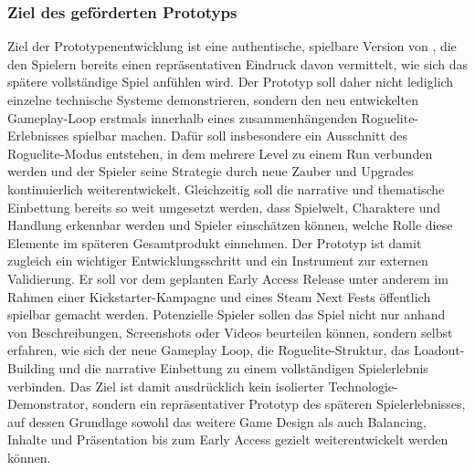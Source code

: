 \subsubsection{Ziel des geförderten Prototyps}
Ziel der Prototypenentwicklung ist eine authentische, spielbare Version von \coc, die den Spielern bereits einen repräsentativen Eindruck davon vermittelt, wie sich das spätere vollständige Spiel anfühlen wird.
Der Prototyp soll daher nicht lediglich einzelne technische Systeme demonstrieren, sondern den neu entwickelten Gameplay-Loop erstmals innerhalb eines zusammenhängenden Roguelite-Erlebnisses spielbar machen.
Dafür soll insbesondere ein Ausschnitt des Roguelite-Modus entstehen, in dem mehrere Level zu einem Run verbunden werden und der Spieler seine Strategie durch neue Zauber und Upgrades kontinuierlich weiterentwickelt.
Gleichzeitig soll die narrative und thematische Einbettung bereits so weit umgesetzt werden, dass Spielwelt, Charaktere und Handlung erkennbar werden und Spieler einschätzen können, welche Rolle diese Elemente im späteren Gesamtprodukt einnehmen.
Der Prototyp ist damit zugleich ein wichtiger Entwicklungsschritt und ein Instrument zur externen Validierung.
Er soll vor dem geplanten Early Access Release unter anderem im Rahmen einer Kickstarter-Kampagne und eines Steam Next Fests öffentlich spielbar gemacht werden.
Potenzielle Spieler sollen das Spiel nicht nur anhand von Beschreibungen, Screenshots oder Videos beurteilen können, sondern selbst erfahren, wie sich der neue Gameplay Loop, die Roguelite-Struktur, das Loadout-Building und die narrative Einbettung zu einem vollständigen Spielerlebnis verbinden.
Das Ziel ist damit ausdrücklich kein isolierter Technologie-Demonstrator, sondern ein repräsentativer Prototyp des späteren Spielerlebnisses, auf dessen Grundlage sowohl das weitere Game Design als auch Balancing, Inhalte und Präsentation bis zum Early Access gezielt weiterentwickelt werden können.
